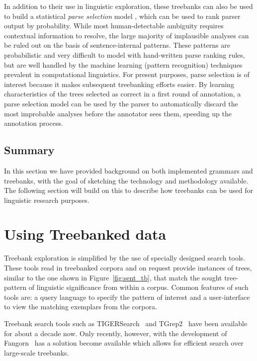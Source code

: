 \documentclass[12pt]{article}
\begin{document}
In addition to their use in linguistic exploration, these treebanks can also be
used to build a statistical \textit{parse selection} model
\cite{Joh:Gem:Can:Chi:Rie:99,Tou:Man:Fli:Oep:2005}, which can be used to rank
parser output by probability.  While most human-detectable ambiguity requires
contextual information to resolve, the large majority of implausible analyses
can be ruled out on the basis of sentence-internal patterns.  These patterns are
probabilistic and very difficult to model with hand-written parse ranking rules,
but are well handled by the machine learning (pattern recognition) techniques
prevalent in computational linguistics.  For present purposes, parse selection
is of interest because it makes subsequent treebanking efforts easier.  By
learning characteristics of the trees selected as correct in a first round of
annotation, a parse selection model can be used by the parser to automatically
discard the most improbable analyses before the annotator sees them, speeding up
the annotation process.

\subsection{Summary}

In this section we have provided background on both implemented
grammars and treebanks, with the goal of sketching the technology
and methodology available.  The following section will build on this
to describe how treebanks can be used for linguistic research purposes.

\section{Using Treebanked data}
\label{sec:ts}

Treebank exploration is simplified by the use of specially designed
search tools.  These tools read in treebanked corpora and on request
provide instances of trees, similar to the one shown in 
Figure~\ref{fig:sent_tb}, that match the sought tree-pattern of linguistic 
significance from within a corpus.  Common features of
such tools are: a query language to specify the pattern of
interest and a user-interface to view the matching exemplars from
the corpora.

Treebank search tools such as TIGERSearch~\cite{Lez:Kon:00} and 
TGrep2~\cite{Roh:05} have been available for about a decade now.  
Only recently, however, with the development of Fangorn~\cite{Gho:Bir:10} 
has a solution become available which allows for efficient search 
over large-scale treebanks. 
\end{document}
